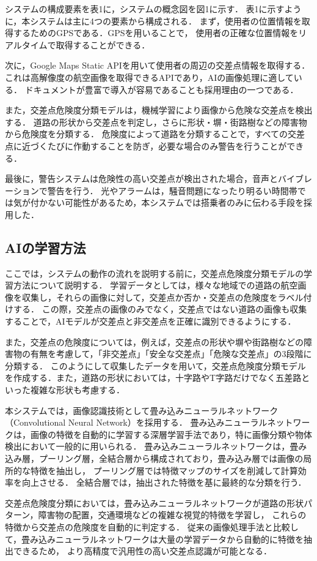 \documentclass[uplatex,dvipdfmx]{jsarticle}
\begin{document}
\indent
システムの構成要素を表1に，システムの概念図を図1に示す．
表1に示すように，本システムは主に4つの要素から構成される．
まず，使用者の位置情報を取得するためのGPSである．GPSを用いることで，
使用者の正確な位置情報をリアルタイムで取得することができる．
\par
次に，Google Maps Static APIを用いて使用者の周辺の交差点情報を取得する．
これは高解像度の航空画像を取得できるAPIであり，AIの画像処理に適している．
ドキュメントが豊富で導入が容易であることも採用理由の一つである．
\par
また，交差点危険度分類モデルは，機械学習により画像から危険な交差点を検出する．
道路の形状から交差点を判定し，さらに形状・塀・街路樹などの障害物から危険度を分類する．
危険度によって道路を分類することで，すべての交差点に近づくたびに作動することを防ぎ，必要な場合のみ警告を行うことができる．
\par
最後に，警告システムは危険性の高い交差点が検出された場合，音声とバイブレーションで警告を行う．
光やアラームは，騒音問題になったり明るい時間帯では気が付かない可能性があるため，本システムでは搭乗者のみに伝わる手段を採用した．

\subsection{AIの学習方法}

ここでは，システムの動作の流れを説明する前に，交差点危険度分類モデルの学習方法について説明する．
学習データとしては，様々な地域での道路の航空画像を収集し，それらの画像に対して，交差点か否か・交差点の危険度をラベル付けする．
この際，交差点の画像のみでなく，交差点ではない道路の画像も収集することで，AIモデルが交差点と非交差点を正確に識別できるようにする．
\par
また，交差点の危険度については，例えば，交差点の形状や塀や街路樹などの障害物の有無を考慮して，「非交差点」「安全な交差点」「危険な交差点」の3段階に分類する．
このようにして収集したデータを用いて，交差点危険度分類モデルを作成する．また，道路の形状においては，十字路やT字路だけでなく五差路といった複雑な形状も考慮する．
\par
本システムでは，画像認識技術として畳み込みニューラルネットワーク（Convolutional Neural Network）を採用する．
畳み込みニューラルネットワークは，画像の特徴を自動的に学習する深層学習手法であり，特に画像分類や物体検出において一般的に用いられる\cite{ref:newral}．
畳み込みニューラルネットワークは，畳み込み層，プーリング層，全結合層から構成されており，畳み込み層では画像の局所的な特徴を抽出し，
プーリング層では特徴マップのサイズを削減して計算効率を向上させる．
全結合層では，抽出された特徴を基に最終的な分類を行う．
\par
交差点危険度分類においては，畳み込みニューラルネットワークが道路の形状パターン，障害物の配置，交通環境などの複雑な視覚的特徴を学習し，
これらの特徴から交差点の危険度を自動的に判定する．
従来の画像処理手法と比較して，畳み込みニューラルネットワークは大量の学習データから自動的に特徴を抽出できるため，
より高精度で汎用性の高い交差点認識が可能となる．
\par
\end{document}
